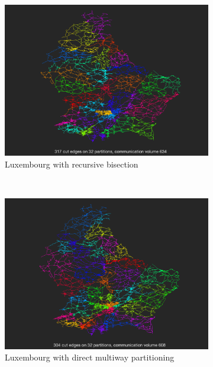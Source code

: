 \begin{figure}[H]
\begin{subfigure}{0.5\textwidth}
		\includegraphics[width=\textwidth]{./media/lux_metis.png}
		\caption{Luxembourg with recursive bisection}
		\label{fig:lux_metis}
	\end{subfigure}%
	~
	\begin{subfigure}{0.5\textwidth}
		\includegraphics[width=\textwidth]{./media/lux_metis_k.png}
		\caption{Luxembourg with direct multiway partitioning}
		\label{fig:lux_metis_k}
	\end{subfigure}
	\begin{subfigure}{0.5\textwidth}

\end{subfigure}
\end{figure}
